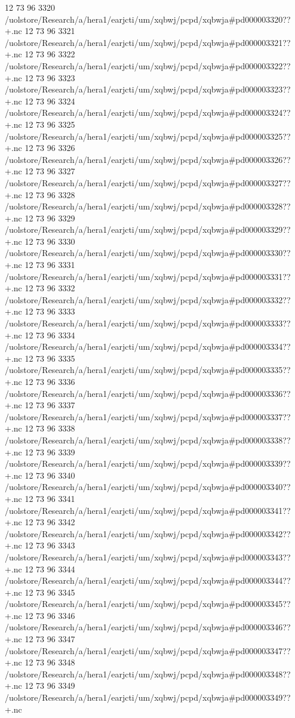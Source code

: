 12 73 96
3320
/uolstore/Research/a/hera1/earjcti/um/xqbwj/pcpd/xqbwja#pd000003320??+.nc
12 73 96
3321
/uolstore/Research/a/hera1/earjcti/um/xqbwj/pcpd/xqbwja#pd000003321??+.nc
12 73 96
3322
/uolstore/Research/a/hera1/earjcti/um/xqbwj/pcpd/xqbwja#pd000003322??+.nc
12 73 96
3323
/uolstore/Research/a/hera1/earjcti/um/xqbwj/pcpd/xqbwja#pd000003323??+.nc
12 73 96
3324
/uolstore/Research/a/hera1/earjcti/um/xqbwj/pcpd/xqbwja#pd000003324??+.nc
12 73 96
3325
/uolstore/Research/a/hera1/earjcti/um/xqbwj/pcpd/xqbwja#pd000003325??+.nc
12 73 96
3326
/uolstore/Research/a/hera1/earjcti/um/xqbwj/pcpd/xqbwja#pd000003326??+.nc
12 73 96
3327
/uolstore/Research/a/hera1/earjcti/um/xqbwj/pcpd/xqbwja#pd000003327??+.nc
12 73 96
3328
/uolstore/Research/a/hera1/earjcti/um/xqbwj/pcpd/xqbwja#pd000003328??+.nc
12 73 96
3329
/uolstore/Research/a/hera1/earjcti/um/xqbwj/pcpd/xqbwja#pd000003329??+.nc
12 73 96
3330
/uolstore/Research/a/hera1/earjcti/um/xqbwj/pcpd/xqbwja#pd000003330??+.nc
12 73 96
3331
/uolstore/Research/a/hera1/earjcti/um/xqbwj/pcpd/xqbwja#pd000003331??+.nc
12 73 96
3332
/uolstore/Research/a/hera1/earjcti/um/xqbwj/pcpd/xqbwja#pd000003332??+.nc
12 73 96
3333
/uolstore/Research/a/hera1/earjcti/um/xqbwj/pcpd/xqbwja#pd000003333??+.nc
12 73 96
3334
/uolstore/Research/a/hera1/earjcti/um/xqbwj/pcpd/xqbwja#pd000003334??+.nc
12 73 96
3335
/uolstore/Research/a/hera1/earjcti/um/xqbwj/pcpd/xqbwja#pd000003335??+.nc
12 73 96
3336
/uolstore/Research/a/hera1/earjcti/um/xqbwj/pcpd/xqbwja#pd000003336??+.nc
12 73 96
3337
/uolstore/Research/a/hera1/earjcti/um/xqbwj/pcpd/xqbwja#pd000003337??+.nc
12 73 96
3338
/uolstore/Research/a/hera1/earjcti/um/xqbwj/pcpd/xqbwja#pd000003338??+.nc
12 73 96
3339
/uolstore/Research/a/hera1/earjcti/um/xqbwj/pcpd/xqbwja#pd000003339??+.nc
12 73 96
3340
/uolstore/Research/a/hera1/earjcti/um/xqbwj/pcpd/xqbwja#pd000003340??+.nc
12 73 96
3341
/uolstore/Research/a/hera1/earjcti/um/xqbwj/pcpd/xqbwja#pd000003341??+.nc
12 73 96
3342
/uolstore/Research/a/hera1/earjcti/um/xqbwj/pcpd/xqbwja#pd000003342??+.nc
12 73 96
3343
/uolstore/Research/a/hera1/earjcti/um/xqbwj/pcpd/xqbwja#pd000003343??+.nc
12 73 96
3344
/uolstore/Research/a/hera1/earjcti/um/xqbwj/pcpd/xqbwja#pd000003344??+.nc
12 73 96
3345
/uolstore/Research/a/hera1/earjcti/um/xqbwj/pcpd/xqbwja#pd000003345??+.nc
12 73 96
3346
/uolstore/Research/a/hera1/earjcti/um/xqbwj/pcpd/xqbwja#pd000003346??+.nc
12 73 96
3347
/uolstore/Research/a/hera1/earjcti/um/xqbwj/pcpd/xqbwja#pd000003347??+.nc
12 73 96
3348
/uolstore/Research/a/hera1/earjcti/um/xqbwj/pcpd/xqbwja#pd000003348??+.nc
12 73 96
3349
/uolstore/Research/a/hera1/earjcti/um/xqbwj/pcpd/xqbwja#pd000003349??+.nc
